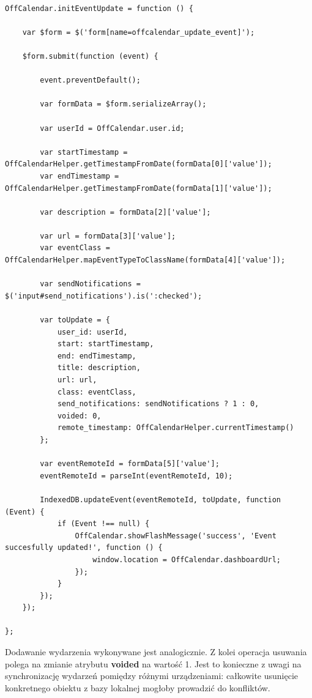 \begin{lstlisting}[caption=Edycja wydarzenia cz. 2., label=amb, captionpos=b]

OffCalendar.initEventUpdate = function () {

    var $form = $('form[name=offcalendar_update_event]');

    $form.submit(function (event) {

        event.preventDefault();

        var formData = $form.serializeArray();

        var userId = OffCalendar.user.id;

        var startTimestamp = OffCalendarHelper.getTimestampFromDate(formData[0]['value']);
        var endTimestamp = OffCalendarHelper.getTimestampFromDate(formData[1]['value']);

        var description = formData[2]['value'];

        var url = formData[3]['value'];
        var eventClass = OffCalendarHelper.mapEventTypeToClassName(formData[4]['value']);

        var sendNotifications = $('input#send_notifications').is(':checked');

        var toUpdate = {
            user_id: userId,
            start: startTimestamp,
            end: endTimestamp,
            title: description,
            url: url,
            class: eventClass,
            send_notifications: sendNotifications ? 1 : 0,
            voided: 0,
            remote_timestamp: OffCalendarHelper.currentTimestamp()
        };

        var eventRemoteId = formData[5]['value'];
        eventRemoteId = parseInt(eventRemoteId, 10);

        IndexedDB.updateEvent(eventRemoteId, toUpdate, function (Event) {
            if (Event !== null) {
                OffCalendar.showFlashMessage('success', 'Event succesfully updated!', function () {
                    window.location = OffCalendar.dashboardUrl;
                });
            }
        });
    });

};

\end{lstlisting}

Dodawanie wydarzenia wykonywane jest analogicznie. Z kolei operacja usuwania polega na zmianie atrybutu \textbf{voided} na wartość 1. Jest to konieczne z uwagi na synchronizację wydarzeń pomiędzy różnymi urządzeniami: całkowite usunięcie konkretnego obiektu z bazy lokalnej mogłoby prowadzić do konfliktów.

